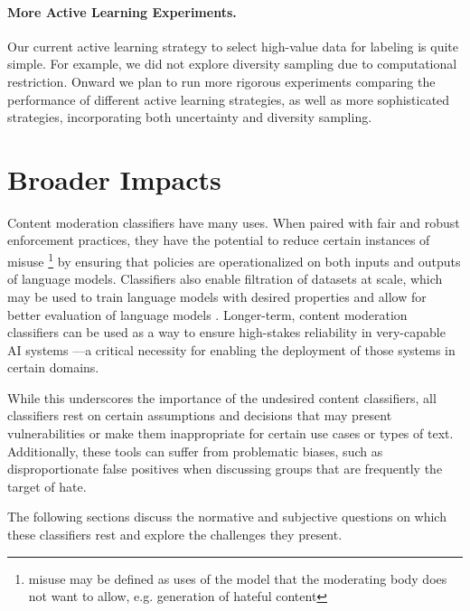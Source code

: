 \documentclass[letterpaper]{article} %
\begin{document}
\paragraph{More Active Learning Experiments.} Our current active learning strategy to select high-value data for labeling is quite simple. For example, we did not explore diversity sampling due to computational restriction. Onward we plan to run more rigorous experiments comparing the performance of different active learning strategies, as well as more sophisticated strategies, incorporating both uncertainty and diversity sampling.


\section{Broader Impacts}

Content moderation classifiers have many uses. When paired with fair and robust enforcement practices, they have the potential to reduce certain instances of misuse \footnote{misuse may be defined as uses of the model that the moderating body does not want to allow, e.g. generation of hateful content} by ensuring that policies are operationalized on both inputs and outputs of language models. Classifiers also enable filtration of datasets at scale, which may be used to train language models with desired properties \cite{welbl2021challenges} and allow for better evaluation of language models \cite{gehman2020realtoxicityprompts}. Longer-term, content moderation classifiers can be used as a way to ensure high-stakes reliability in very-capable AI systems \cite{ziegler2022adv}---a critical necessity for enabling the deployment of those systems in certain domains.

While this underscores the importance of the undesired content classifiers, all classifiers rest on certain assumptions and decisions that may present vulnerabilities or make them inappropriate for certain use cases or types of text. Additionally, these tools can suffer from problematic biases, such as disproportionate false positives when discussing groups that are frequently the target of hate. \cite{Garg2019Counterfactual}

The following sections discuss the normative and subjective questions on which these classifiers rest and explore the challenges they present.
\end{document}
